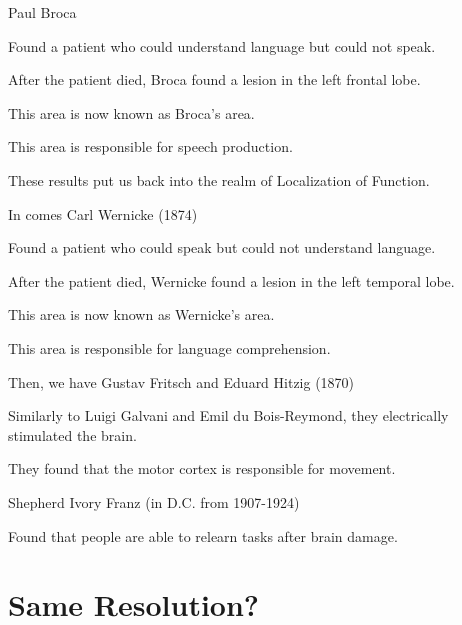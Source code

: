 \begin{coloredlist}
\begin{coloredlist}
    \end{coloredlist}
    \item Paul Broca
    \begin{coloredlist}
        \item Found a patient who could understand language but could not speak.
        \item After the patient died, Broca found a lesion in the left frontal lobe.
        \item This area is now known as Broca's area.
        \item This area is responsible for speech production.
        \item These results put us back into the realm of Localization of Function.
    \end{coloredlist}
    \item In comes Carl Wernicke (1874)
    \begin{coloredlist}
        \item Found a patient who could speak but could not understand language.
        \item After the patient died, Wernicke found a lesion in the left temporal lobe.
        \item This area is now known as Wernicke's area.
        \item This area is responsible for language comprehension.
    \end{coloredlist}
    \item Then, we have Gustav Fritsch and Eduard Hitzig (1870)
    \begin{coloredlist}
        \item Similarly to Luigi Galvani and Emil du Bois-Reymond, they electrically stimulated the brain.
        \item They found that the motor cortex is responsible for movement.
    \end{coloredlist}
    \item Shepherd Ivory Franz (in D.C. from 1907-1924)
    \begin{coloredlist}
        \item Found that people are able to relearn tasks after brain damage.
    \end{coloredlist}
\end{coloredlist}
\section{Same Resolution?}

